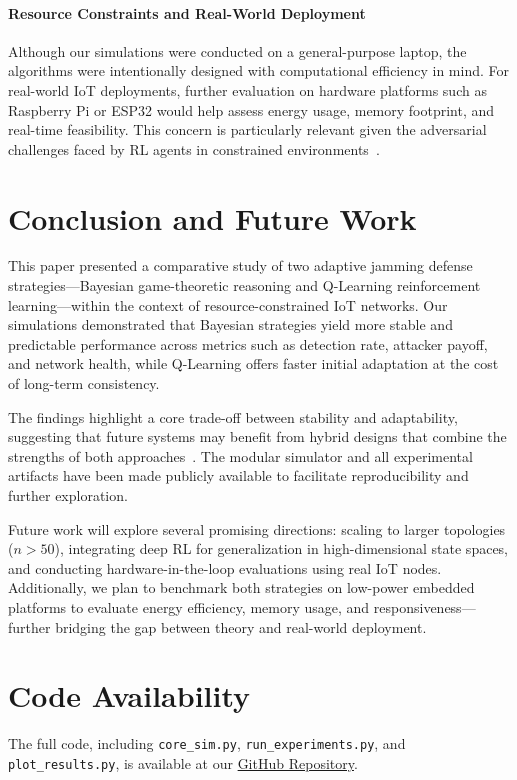 \documentclass[conference]{IEEEtran}
\begin{document}
\paragraph{Resource Constraints and Real-World Deployment}

Although our simulations were conducted on a general-purpose laptop, the algorithms were intentionally designed with computational efficiency in mind. For real-world IoT deployments, further evaluation on hardware platforms such as Raspberry Pi or ESP32 would help assess energy usage, memory footprint, and real-time feasibility. This concern is particularly relevant given the adversarial challenges faced by RL agents in constrained environments~\cite{wang2023adversarial}.

\section{Conclusion and Future Work}

This paper presented a comparative study of two adaptive jamming defense strategies—Bayesian game-theoretic reasoning and Q-Learning reinforcement learning—within the context of resource-constrained IoT networks. Our simulations demonstrated that Bayesian strategies yield more stable and predictable performance across metrics such as detection rate, attacker payoff, and network health, while Q-Learning offers faster initial adaptation at the cost of long-term consistency.

The findings highlight a core trade-off between stability and adaptability, suggesting that future systems may benefit from hybrid designs that combine the strengths of both approaches~\cite{khoury2020hybrid}. The modular simulator and all experimental artifacts have been made publicly available to facilitate reproducibility and further exploration.

Future work will explore several promising directions: scaling to larger topologies ($n > 50$), integrating deep RL for generalization in high-dimensional state spaces, and conducting hardware-in-the-loop evaluations using real IoT nodes. Additionally, we plan to benchmark both strategies on low-power embedded platforms to evaluate energy efficiency, memory usage, and responsiveness—further bridging the gap between theory and real-world deployment.

\section*{Code Availability}
The full code, including \texttt{core\_sim.py}, \texttt{run\_experiments.py}, and \texttt{plot\_results.py}, is available at our \href{https://github.com/UmarYaksambi/Adaptive-Defense-Wireless-Networks}{GitHub Repository}.
\end{document}
